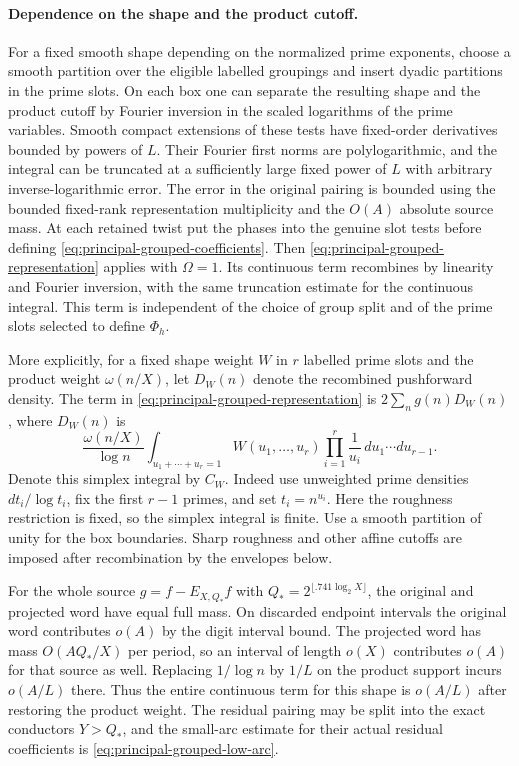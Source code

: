 \documentclass[11pt,a4paper]{article}
\theoremstyle{paperplain}
\numberwithin{equation}{section}
\begin{document}
\paragraph{Dependence on the shape and the product cutoff.}
For a fixed smooth shape depending on the normalized prime exponents,
choose a smooth partition over the eligible labelled groupings and
insert dyadic partitions in the prime slots. On each box one can
separate the resulting shape and the product cutoff by Fourier
inversion in the scaled logarithms of the prime variables. Smooth
compact extensions of these tests have fixed-order derivatives
bounded by powers of $L$. Their Fourier first norms are
polylogarithmic, and the integral can be truncated at a sufficiently
large fixed power of $L$ with arbitrary inverse-logarithmic error.
The error in the original pairing is bounded using the bounded
fixed-rank representation multiplicity and the $O(A)$ absolute
source mass. At each retained twist put the phases into the genuine
slot tests before defining \eqref{eq:principal-grouped-coefficients}.
Then \eqref{eq:principal-grouped-representation} applies with
$\Omega=1$. Its continuous term recombines by linearity and Fourier
inversion, with the same truncation estimate for the continuous
integral. This term is independent of the choice of group split
and of the prime slots selected to define $\Phi_h$.

More explicitly, for a fixed shape weight $W$ in $r$ labelled
prime slots and the product weight $\omega(n/X)$, let $D_W(n)$ denote
the recombined pushforward density. The term in
\eqref{eq:principal-grouped-representation} is $2\sum_n g(n)D_W(n)$, where
$D_W(n)$ is
\[
 \frac{\omega(n/X)}{\log n}
    \int_{u_1+\cdots+u_r=1} W(u_1,\ldots,u_r)
                        \prod_{i=1}^r\frac1{u_i}\,du_1\cdots du_{r-1}.
\]
Denote this simplex integral by $C_W$. Indeed use unweighted prime densities $dt_i/\log t_i$, fix the
first $r-1$ primes, and set $t_i=n^{u_i}$. Here the roughness
restriction is fixed, so the simplex integral is finite. Use a smooth partition of unity for the box boundaries. Sharp roughness and other affine cutoffs are imposed after recombination by the envelopes below.

For the whole source $g=f-E_{X,Q_*}f$ with
$Q_*=2^{\lfloor .741\log_2 X\rfloor}$, the original and projected
word have equal full mass. On discarded endpoint intervals the
original word contributes $o(A)$ by the digit interval bound.
The projected word has mass $O(AQ_*/X)$ per period, so an interval
of length $o(X)$ contributes $o(A)$ for that source as well.
Replacing $1/\log n$ by $1/L$ on the product support incurs
$o(A/L)$ there. Thus the entire continuous term for this shape
is $o(A/L)$ after restoring the product weight. The residual
pairing may be split into the exact conductors $Y>Q_*$, and the
small-arc estimate for their actual residual coefficients is
\eqref{eq:principal-grouped-low-arc}.
\end{document}
